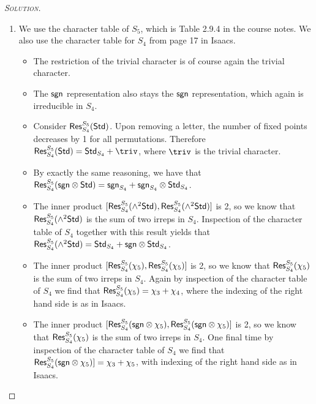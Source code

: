 \begin{proof}[{\scshape Solution}]
  \hfill

  \begin{enumerate}[font=\normalfont,label=\textbf{(\Alph*)}, wide]
    \item We use the character table of $S_5$, which is Table 2.9.4 in the course notes. We also use the character table for $S_4$ from page 17 in Isaacs.
    \begin{itemize}
    \item The restriction of the trivial character is of course again the trivial character.

    \item The $\mathsf{sgn}$ representation also stays the $\mathsf{sgn}$ representation, which again is irreducible in $S_4$.

    \item Consider $\mathsf{Res}^{S_5}_{S_4}(\mathsf{Std})$. Upon removing a letter, the number of fixed points decreases by 1 for all permutations. Therefore $\Res^{S_5}_{S_4}(\Std) = \Std_{S_4} + \triv$, where $\triv$ is the trivial character.

    \item By exactly the same reasoning, we have that $\mathsf{Res}^{S_5}_{S_4}(\mathsf{sgn} \otimes \mathsf{Std}) = \mathsf{sgn}_{S_4} + \mathsf{sgn}_{S_4} \otimes \mathsf{Std}_{S_4}$.

    \item The inner product $[\mathsf{Res}^{S_5}_{S_4}(\wedge^2 \mathsf{Std}), \mathsf{Res}^{S_5}_{S_4}(\wedge^2 \mathsf{Std})]$ is 2, so we know that $\mathsf{Res}^{S_5}_{S_4}(\wedge^2 \mathsf{Std})$ is the sum of two irreps in $S_4$. Inspection of the character table of $S_4$ together with this result yields that $\mathsf{Res}^{S_5}_{S_4}(\wedge^2 \mathsf{Std}) = \mathsf{Std}_{S_4} + \mathsf{sgn} \otimes \mathsf{Std}_{S_4}$.

    \item The inner product $[\mathsf{Res}^{S_5}_{S_4}(\chi_5), \mathsf{Res}^{S_5}_{S_4}(\chi_5)]$ is 2, so we know that $\mathsf{Res}^{S_5}_{S_4}(\chi_5)$ is the sum of two irreps in $S_4$. Again by inspection of the character table of $S_4$ we find that $\mathsf{Res}^{S_5}_{S_4}(\chi_5) = \chi_3 + \chi_4$, where the indexing of the right hand side is as in Isaacs.

    \item The inner product $[\mathsf{Res}^{S_5}_{S_4}(\mathsf{sgn} \otimes \chi_5), \mathsf{Res}^{S_5}_{S_4}(\mathsf{sgn} \otimes \chi_5)]$ is 2, so we know that $\mathsf{Res}^{S_5}_{S_4}(\chi_5)$ is the sum of two irreps in $S_4$. One final time by inspection of the character table of $S_4$ we find that $\mathsf{Res}^{S_5}_{S_4}(\mathsf{sgn} \otimes \chi_5)] = \chi_3 + \chi_5$, with indexing of the right hand side as in Isaacs.
    \end{itemize}


\end{enumerate}
\end{proof}
